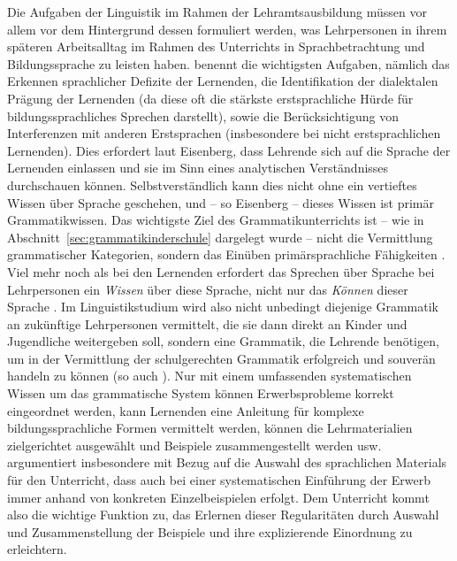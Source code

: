 Die Aufgaben der Linguistik im Rahmen der Lehramtsausbildung müssen vor allem vor dem Hintergrund dessen formuliert werden, was Lehrpersonen in ihrem späteren Arbeitsalltag im Rahmen des Unterrichts in Sprachbetrachtung und Bildungssprache zu leisten haben.
\citet[7]{Eisenberg2013c} benennt die wichtigsten Aufgaben, nämlich das Erkennen sprachlicher Defizite der Lernenden, die Identifikation der dialektalen Prägung der Lernenden (da diese oft die stärkste erstsprachliche Hürde für bildungssprachliches Sprechen darstellt), sowie die Berücksichtigung von Interferenzen mit anderen Erstsprachen (insbesondere bei nicht erstsprachlichen Lernenden).
Dies erfordert laut Eisenberg, dass Lehrende sich auf die Sprache der Lernenden einlassen und sie im Sinn eines analytischen Verständnisses durchschauen können.
Selbstverständlich kann dies nicht ohne ein vertieftes Wissen über Sprache geschehen, und -- so Eisenberg -- dieses Wissen ist primär Grammatikwissen.
Das wichtigste Ziel des Grammatikunterrichts ist -- wie in Abschnitt~\ref{sec:grammatikinderschule} dargelegt wurde -- nicht die Vermittlung grammatischer Kategorien, sondern das Einüben primärsprachliche Fähigkeiten \citep[77]{Bredel2013}.
Viel mehr noch als bei den Lernenden erfordert das Sprechen über Sprache bei Lehrpersonen ein \textit{Wissen} über diese Sprache, nicht nur das \textit{Können} dieser Sprache \citep[94]{Bredel2013}.
Im Linguistikstudium wird also nicht unbedingt diejenige Grammatik an zukünftige Lehrpersonen vermittelt, die sie dann direkt an Kinder und Jugendliche weitergeben soll, sondern eine Grammatik, die Lehrende benötigen, um in der Vermittlung der schulgerechten Grammatik erfolgreich und souverän handeln zu können (so auch \citealt[19]{Eisenberg2004}).
Nur mit einem umfassenden systematischen Wissen um das grammatische System können Erwerbsprobleme korrekt eingeordnet werden, kann Lernenden eine Anleitung für komplexe bildungssprachliche Formen vermittelt werden, können die Lehrmaterialien zielgerichtet ausgewählt und Beispiele zusammengestellt werden usw.
\citet[81--83]{Portmanntselikas2011} argumentiert insbesondere mit Bezug auf die Auswahl des sprachlichen Materials für den Unterricht, dass auch bei einer systematischen Einführung der Erwerb immer anhand von konkreten Einzelbeispielen erfolgt.
Dem Unterricht kommt also die wichtige Funktion zu, das Erlernen dieser Regularitäten durch Auswahl und Zusammenstellung der Beispiele und ihre explizierende Einordnung zu erleichtern.


